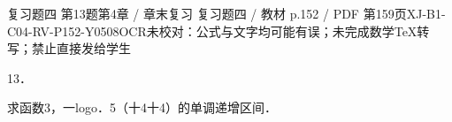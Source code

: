 \begin{bankitem}{复习题四 第13题}{第4章 / 章末复习 复习题四 / 教材 p.152 / PDF 第159页}{XJ-B1-C04-RV-P152-Y0508}{OCR未校对：公式与文字均可能有误；未完成数学TeX转写；禁止直接发给学生}
\begin{ocrdraft}
\par
13．
\par
求函数3，一logo．5（十4十4）的单调递增区间．
\end{ocrdraft}
\end{bankitem}
